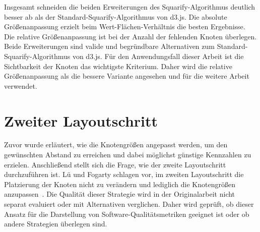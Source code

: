 Insgesamt schneiden die beiden Erweiterungen des Squarify-Algorithmus deutlich besser ab als der Standard-Squarify-Algorithmus von d3.js. Die absolute Größenanpassung erzielt beim Wert-Flächen-Verhältnis die besten Ergebnisse. Die relative Größenanpassung ist bei der Anzahl der fehlenden Knoten überlegen. Beide Erweiterungen sind valide und begründbare Alternativen zum Standard-Squarify-Algorithmus von d3.js. Für den Anwendungsfall dieser Arbeit ist die Sichtbarkeit der Knoten das wichtigste Kriterium. Daher wird die relative Größenanpassung als die bessere Variante angesehen und für die weitere Arbeit verwendet.


\section{Zweiter Layoutschritt} \label{sec:ReihenfolgeKnotenZweitesLayout}

Zuvor wurde erläutert, wie die Knotengrößen angepasst werden, um den gewünschten Abstand zu erreichen und dabei möglichst günstige Kennzahlen zu erzielen. Anschließend stellt sich die Frage, wie der zweite Layoutschritt durchzuführen ist. Lü und Fogarty schlagen vor, im zweiten Layoutschritt die Platzierung der Knoten nicht zu verändern und lediglich die Knotengrößen anzupassen~\cite{lu2008cascaded}. Die Qualität dieser Strategie wird in der Originalarbeit nicht separat evaluiert oder mit Alternativen verglichen. Daher wird geprüft, ob dieser Ansatz für die Darstellung von Software-Qualitätsmetriken geeignet ist oder ob andere Strategien überlegen sind.

